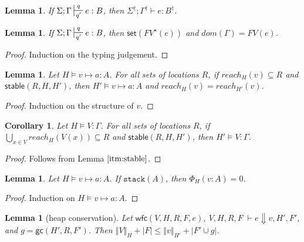 \documentclass[sigconf]{acmart}
\newcommand{\irl}[1]{\mathtt{#1}}
\newcommand{\stable}[1]{\mathsf{stable}(#1)}
\newcommand{\set}[1]{\mathsf{set}(#1)}
\newcommand{\stack}[1]{\irl{stack}(#1)}
\newcommand{\ssize}[2]{\left\Vert #2 \right\Vert_{#1}}
\newcommand{\gc}[3]{\mathsf{gc}(#1,#2,#3)}
\newcommand{\wfc}[5]{\mathsf{wfc}(#1,#2,#3,#4,#5)}
\newtheorem{lemma}[theorem]{Lemma}
\newtheorem{corollary}{Corollary}[theorem]
\theoremstyle{definition}
\begin{document}
\begin{lemma}
\label{a} If $\Sigma; \Gamma \sststile{q'}{q} e : B$, then $\Sigma^{\dagger}; \Gamma^{\dagger} \vdash e : B^{\dagger}$.
\end{lemma}

\begin{lemma}\label{itm:linear}
\label{a} If $\Sigma; \Gamma \sststile{q'}{q} e : B$, then $\set{FV^{\star}(e)}$ and $dom(\Gamma) = FV(e)$.
\end{lemma}

\begin{proof}
Induction on the typing judgement.
\end{proof}

\begin{lemma}\label{itm:stable}
Let $H \vDash v \mapsto a : A$. For all sets of locations $R$, if $reach_H(v) \subseteq R$ and $\stable{R,H,H'}$, then $H' \vDash v \mapsto a : A$ and $reach_H(v) = reach_{H'}(v)$.
\end{lemma}

\begin{proof}
Induction on the structure of $v$.
\end{proof}

\begin{corollary}
Let $H \vDash V : \Gamma$. For all sets of locations $R$, if $\bigcup_{x \in V} reach_H(V(x)) \subseteq R$ and $\stable{R,H,H'}$, then $H' \vDash V : \Gamma$.
\end{corollary}

\begin{proof}
Follows from Lemma $\ref{itm:stable}$.
\end{proof}

\begin{lemma}\label{itm:stack}
Let $H \vDash v \mapsto a : A$. If $\stack{A}$, then $\Phi_H(v:A) = 0$.
\end{lemma}

\begin{proof}
Induction on $H \vDash v \mapsto a : A$.
\end{proof}

\begin{lemma}[heap conservation]
Let $\wfc{V}{H}{R}{F}{e}$, $V,H,R,F \; \vdash e \Downarrow v, H', F'$, and $g = \gc{H'}{R}{F'}$. 
Then $\ssize{H}{V} + |F| \le \ssize{H'}{v} + |F' \cup g|$.
\end{lemma}
\end{document}
